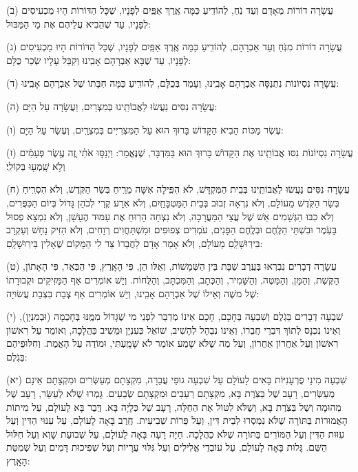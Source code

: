 \documentclass[twoside, openany, parskip=half, 11pt]{book}
\begin{document}
(ב)
 עֲשָׂרָה דוֹרוֹת מֵאָדָם וְעַד נֹֽחַ, לְהוֹדִֽיעַ כַּמָּה אֶֽרֶךְ אַפַּֽיִם לְפָנָיו, שֶׁכָּל הַדּוֹרוֹת הָיוּ מַכְעִיסִים לְפָנָיו, עַד שֶׁהֵבִיא עֲלֵיהֶם אֶת מֵי הַמַּבּוּל:

(ג)
 עֲשָׂרָה דוֹרוֹת מִנֹּֽחַ וְעַד אַבְרָהָם, לְהוֹדִֽיעַ כַּמָּה אֶֽרֶךְ אַפַּֽיִם לְפָנָיו, שֶׁכָּל הַדּוֹרוֹת הָיוּ מַכְעִיסִים לְפָנָיו, עַד שֶׁבָּא אַבְרָהָם אָבִֽינוּ וְקִבֵּל עָלָיו שְׂכַר כֻּלָּם: 

(ד)
 עֲשָׂרָה נִסְיוֹנוֹת נִתְנַסָּה אַבְרָהָם אָבִֽינוּ, וְעָמַד בְּכֻלָּם, לְהוֹדִֽיעַ כַּמָּה חִבָּתוֹ שֶׁל אַבְרָהָם אָבִֽינוּ: 

(ה)
 עֲשָׂרָה נִסִּים נַעֲשׂוּ לַאֲבוֹתֵֽינוּ בְּמִצְרַיִם, וַעֲשָׂרָה עַל הַיָּם: 

(ו)
 עֶשֶׂר מַכּוֹת הֵבִיא הַקָּדוֹשׁ בָּרוּךְ הוּא עַל הַמִּצְרִיִּים בְּמִצְרַֽיִם, וְעֶשֶׂר עַל הַיָּם: 

(ז)
 עֲשָׂרָה נִסְיוֹנוֹת נִסּוּ אֲבוֹתֵֽינוּ אֶת הַקָּדוֹשׁ בָּרוּךְ הוּא בַּמִּדְבָּר, שֶׁנֶּאֱמַר: וַיְנַסּ֣וּ אֹתִ֗י זֶ֚ה עֶ֣שֶׂר פְּעָמִ֔ים וְלֹ֥א שָֽׁמְע֖וּ בְּקוֹלִֽי׃

(ח)
 עֲשָׂרָה נִסִּים נַעֲשׂוּ לַאֲבוֹתֵֽינוּ בְּבֵית הַמִּקְדָּשׁ, לֹא הִפִּֽילָה אִשָּׁה מֵרֵֽיחַ בְּשַׂר הַקֹּֽדֶשׁ, וְלֹא הִסְרִֽיחַ בְּשַׂר הַקֹּֽדֶשׁ מֵעוֹלָם, וְלֹא נִרְאָה זְבוּב בְּבֵית הַמַּטְבָּחַֽיִם, וְלֹא אִרָע קֶֽרִי לְכֹהֵן גָּדוֹל בְּיוֹם הַכִּפֻּרִים, וְלֹא כִבּוּ הַגְּשָׁמִים אֵשׁ שֶׁל עֲצֵי הַמַּעֲרָכָה, וְלֹא נִצְחָה הָרֽוּחַ אֶת עַמּוּד הֶעָשָׁן, וְלֹא נִמְצָא פְסוּל בָּעֹֽמֶר וּבִשְׁתֵּי הַלֶּֽחֶם וּבְלֶֽחֶם הַפָּנִים, עֹמְדִים צְפוּפִים וּמִשְׁתַּחֲוִים רְוָחִים, וְלֹא הִזִּיק נָחָשׁ וְעַקְרָב בִּירֽוּשָׁלַֽםִ מֵעוֹלָם, וְלֹא אָמַר אָדָם לַחֲבֵרוֹ צַר לִי הַמָּקוֹם שֶׁאָלִין בִּירֽוּשָׁלָֽםִ: 

(ט)
 עֲשָׂרָה דְבָרִים נִבְרְאוּ בְּעֶֽרֶב שַׁבָּת בֵּין הַשְּׁמָשׁוֹת, וְאֵלּו הֵן, פִּי הָאָֽרֶץ, פִּי הַבְּאֵר, פִּי הָאָתוֹן, הַקֶּשֶׁת, וְהַמָּן, וְהַמַּטֶּה, וְהַשָּׁמִיר, וְהַכְּתָב, וְהַמִּכְתָּב, וְהַלֻּחוֹת. וְיֵשׁ אוֹמְרִים אַף הַמַּזִּיקִים וּקְבוּרָתוֹ שֶׁל משֶׁה וְאֵילוֹ שֶׁל אַבְרָהָם אָבִֽינוּ, וְיֵשׁ אוֹמְרִים אַף צְבַת בִּצְבַת עֲשׂוּיָה: 

(י) שִׁבְעָה דְבָרִים בַּגֹֽלֶם וְשִׁבְעָה בְּחָכָם, חָכָם אֵינוֹ מְדַבֵּר לִפְנֵי מִי שֶׁגָּדוֹל מִמֶּֽנּוּ בְּחָכְמָה (וּבְמִנְיָן), וְאֵינוֹ נִכְנָס לְתוֹךְ דִּבְרֵי חֲבֵרוֹ, וְאֵינוֹ נִבְהָל לְהָשִׁיב, שׁוֹאֵל כְּעִנְיָן וּמֵשִׁיב כַּהֲלָכָה, וְאוֹמֵר עַל רִאשׁוֹן רִאשׁוֹן וְעַל אַחֲרוֹן אַחֲרוֹן, וְעַל מַה שֶׁלֹּא שָׁמַע אוֹמֵר לֹא שָׁמָֽעְתִּי, וּמוֹדֶה עַל הָאֱמֶת. וְחִלּוּפֵיהֶם בְּגֹֽלֶם: 

(יא)
 שִׁבְעָה מִינֵי פֻרְעָנִיּוֹת בָּאִים לָעוֹלָם עַל שִׁבְעָה גוּפֵי עֲבֵרָה, מִקְצָתָם מְעַשְּׂרִים וּמִקְצָתָם אֵינָם מְעַשְּׂרִים, רָעָב שֶׁל בַּצֹּֽרֶת בָּא, מִקְצָתָם רְעֵבִים וּמִקְצָתָם שְׂבֵעִים. גָּמְרוּ שֶׁלֹּא לְעַשֵּׂר, רָעָב שֶׁל מְהוּמָה וְשֶׁל בַּצֹּֽרֶת בָּא, וְשֶׁלֹּא לִטּוֹל אֶת הַחַלָּה, רָעָב שֶׁל כְּלָיָה בָּא. דֶּֽבֶר בָּא לָעוֹלָם, עַל מִיתוֹת הָאֲמוּרוֹת בַּתּוֹרָה שֶׁלֹּא נִמְסְרוּ לְבֵית דִּין, וְעַל פֵּרוֹת שְׁבִיעִית. חֶֽרֶב בָּאָה לָעוֹלָם, עַל עִנּוּי הַדִּין וְעַל עִוּוּת הַדִּין וְעַל הַמּוֹרִים בַּתּוֹרָה שֶׁלֹּא כַהֲלָכָה. חַיָּה רָעָה בָּאָה לָעוֹלָם, עַל שְׁבוּעַת שָׁוְא וְעַל חִלּוּל הַשֵּׁם. גָּלוּת בָּאָה לָעוֹלָם, עַל עוֹבְדֵי אֱלִילִים וְעַל גִּלּוּי עֲרָיוֹת וְעַל שְׁפִיכוּת דָּמִים וְעַל שְׁמִטַּת הָאָֽרֶץ: 
\end{document}
